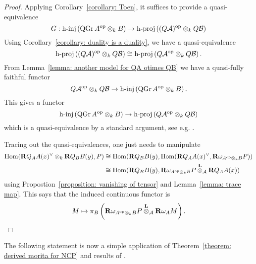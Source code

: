 \begin{proof}
  Applying Corollary~\ref{corollary: Toen}, it suffices to provide a quasi-equivalence
  \begin{displaymath}
    G : \operatorname{h-inj}\left(\operatorname{QGr}A^{\operatorname{op}} \otimes_k B\right) \to \operatorname{h-proj}\left( (Q \mathcal A)^{\operatorname{op}} \otimes_k Q \mathcal B\right)
  \end{displaymath}
  Using Corollary~\ref{corollary: duality is a duality}, we have a quasi-equivalence
  \begin{displaymath}
    \operatorname{h-proj}\left( (Q \mathcal A)^{\operatorname{op}} \otimes_k Q \mathcal B\right) \cong \operatorname{h-proj}\left( Q \mathcal A^{\operatorname{op}} \otimes_k Q \mathcal B\right). 
  \end{displaymath}
  From Lemma~\ref{lemma: another model for QA otimes QB} we have a quasi-fully faithful functor 
  \begin{displaymath}
    Q \mathcal A^{\operatorname{op}} \otimes_k Q \mathcal B \to \operatorname{h-inj}\left(\operatorname{QGr}A^{\operatorname{op}} \otimes_k B\right). 
  \end{displaymath}
  This gives a functor 
  \begin{displaymath}
    \operatorname{h-inj}\left(\operatorname{QGr}A^{\operatorname{op}} \otimes_k B\right) \to \operatorname{h-proj}\left(Q \mathcal A^{\operatorname{op}} \otimes_k Q \mathcal B\right)
  \end{displaymath}
  which is a quasi-equivalence by a standard argument, see e.g. \parencite[Theorem 5.1]{Dyckerhoff11}.
  
  Tracing out the quasi-equivalences, one just needs to manipulate 
  \begin{align*}
    \operatorname{Hom} (\mathbf{R}Q_A A(x)^\vee \otimes_k \mathbf{R}Q_B B(y), P) & \cong \operatorname{Hom} ( \mathbf{R}Q_B B(y) , \operatorname{Hom}( \mathbf{R}Q_A A(x)^\vee, \mathbf{R}\omega_{A^{\operatorname{op}} \otimes_k B} P)) \\
    & \cong \operatorname{Hom} ( \mathbf{R}Q_B B(y) , \mathbf{R}\omega_{A^{\operatorname{op}} \otimes_k B} P \overset{\mathbf{L}}{\otimes}_{\mathcal A} \mathbf{R}Q_A A(x) ) 
  \end{align*}
  using Propostion~\ref{proposition: vanishing of tensor} and Lemma~\ref{lemma: trace map}. This says that the induced continuous functor is
  \begin{displaymath}
    M \mapsto \pi_B \left( \mathbf{R}\omega_{A^{\operatorname{op}} \otimes_k B} P \overset{\mathbf{L}}{\otimes}_{\mathcal A} \mathbf{R}\omega_A M \right). 
  \end{displaymath}
\end{proof}

The following statement is now a simple application of Theorem~\ref{theorem: derived morita for NCP} and results of \parencite{Lunts-Orlov}. 

